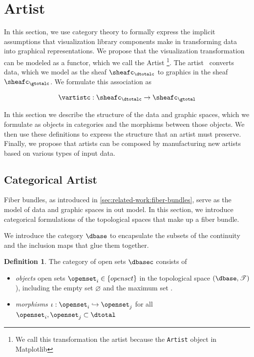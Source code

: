 \documentclass[10pt,journal,compsoc]{IEEEtran}
\theoremstyle{definition}
\newtheorem{definition}{Definition}[section]
\theoremstyle{remark}
\begin{document}
\section{Artist} 
In this section, we use category theory to formally express the implicit assumptions that visualization library components make in transforming data into graphical representations. We propose that the visualization transformation can be modeled as a functor, which we call the \textcolor{artist}{Artist} \vartist \footnote{We call this transformation the artist because the \texttt{Artist} object in Matplotlib\cite{hunterMatplotlib2DGraphics2007}}. The artist \vartist\ converts data, which we model as the sheaf $\sheafc_{\dtotalc}$ to graphics in the sheaf $\sheafc_{\gtotalc}$. We formulate this association as 

\begin{equation}
  \label{eq:artist:artist}
  \vartistc: \sheafc_{\dtotalc} \rightarrow \sheafc_{\gtotal}
\end{equation}

In this section we describe the structure of the data and graphic spaces, which we formulate as objects in categories and the morphisms between those objects. We then use these definitions to express the structure that an artist must preserve. Finally, we propose that artists can be composed by manufacturing new artists based on various types of input data. 

\subsection{Categorical Artist}
\label{sec:artist:category}

Fiber bundles, as introduced in \autoref{sec:related-work:fiber-bundles}, serve as the model of data and graphic spaces in out model. In this section, we introduce categorical formulations of the topological spaces that make up a fiber bundle. 

We introduce the category $\mathcal{\dbase}$ to encapsulate the subsets of the continuity and the inclusion maps that glue them together. 

\begin{definition} \label{def:category:K} The category of open sets $\mathcal{\dbasec}$ consists of
  \begin{itemize}
    \item \textit{objects} open sets $\openset_{i} \in \{openset\}$ in the topological space $(\dbase, \mathscr{T})$), including the empty set $\varnothing$ and the maximum set \dbase. 
    \item \textit{morphisms} $\iota: \openset_{i} \hookrightarrow \openset_{j}$ for all  $\openset_i, \openset_j \subset \dtotal$
  \end{itemize} 
\end{definition}
\end{document}

